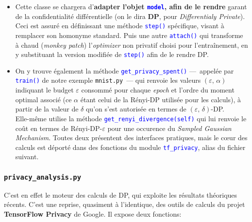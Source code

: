 \documentclass[a4paper,11pt]{article} %
\newcommand{\ttt}[1]{\texttt{#1}}
\newcommand{\file}[1]{\colorbox{blue!10}{\texttt{#1}}}
\newcommand{\code}[1]{\textcolor{blue}{\texttt{#1}}}
\begin{document}
\begin{itemize}
    \item 
     Cette classe se chargera d'\textbf{adapter l'objet \code{model}, afin de le rendre} garant de la confidentialité différentielle (on le dira \textbf{DP}, pour \emph{Differentialy Private}). Ceci est assuré en définissant une méthode \code{step()} spécifique, visant à remplacer son homonyme standard. Puis une autre \code{attach()} qui transforme à chaud (\og \emph{monkey patch}\fg{}) l'\emph{optimizer} non privatif choisi pour l'entraînement, en y substituant la version modifiée de \code{step()} afin de le rendre DP.
    \item 
    On y trouve également la méthode \code{get\_privacy\_spent()} ---~appelée par \code{train()} de notre exemple \file{mnist.py}~--- qui renvoie les valeurs $(\varepsilon,\,\alpha)$ indiquant le budget $\varepsilon$ consommé  pour chaque \emph{epoch} et l'ordre du moment optimal associé (ce $\alpha$ étant celui de la Rényi-DP utilisée pour les calculs), à partir de la valeur de $\delta$ qu'on s'est autorisée en termes de $(\varepsilon,\,\delta)$-DP.\\
    Elle-même utilise la méthode \code{get\_renyi\_divergence(self)} qui lui renvoie le coût en termes de Rényi-DP-$\varepsilon$ pour une occurence du \emph{Sampled Gaussian Mechanism}. Toutes deux présentent des interfaces pratiques, mais le cœur des calculs est déporté dans des fonctions du module \code{tf\_privacy}, alias du fichier suivant.
\end{itemize}
%
\subsubsection{\ttt{privacy\_analysis.py}}
%
C'est en effet le moteur des calculs de DP, qui exploite les résultats théoriques récents. C'est une reprise, quasiment à l'identique, des outils de calculs du projet \textbf{TensorFlow Privacy} de Google. Il expose deux fonctions:
\end{document}
